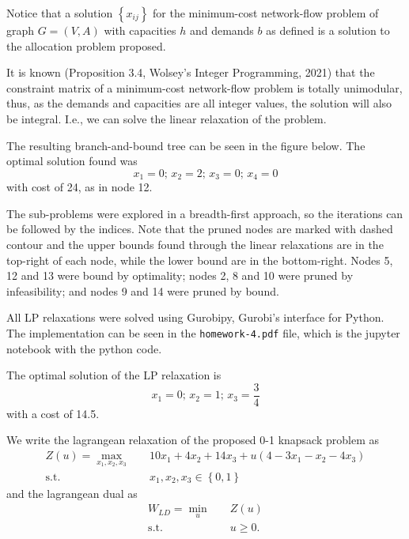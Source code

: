 \documentclass[a4paper]{report}
\begin{document}
Notice that a solution $\left\{ x_{ij} \right\}$ for the minimum-cost network-flow problem of graph $G=\left( V,A \right) $ with capacities $h$ and demands $b$ as defined is a solution to the allocation problem proposed.

It is known (Proposition 3.4, Wolsey's Integer Programming, 2021) that the constraint matrix of a minimum-cost network-flow problem is totally unimodular, thus, as the demands and capacities are all integer values, the solution will also be integral. I.e., we can solve the linear relaxation of the problem.


The resulting branch-and-bound tree can be seen in the figure below. The optimal solution found was \[
x_1 = 0;\, x_2=2;\, x_3=0;\,x_4=0
\] with cost of 24, as in node 12.


The sub-problems were explored in a breadth-first approach, so the iterations can be followed by the indices. Note that the pruned nodes are marked with dashed contour and the upper bounds found through the linear relaxations are in the top-right of each node, while the lower bound are in the bottom-right. Nodes 5, 12 and 13 were bound by optimality; nodes 2, 8 and 10 were pruned by infeasibility; and nodes 9 and 14 were pruned by bound.

All LP relaxations were solved using Gurobipy, Gurobi's interface for Python. The implementation can be seen in the \texttt{homework-4.pdf} file, which is the jupyter notebook with the python code.


The optimal solution of the LP relaxation is \[
x_1 = 0;\, x_2=1;\, x_3=\frac{3}{4}
\] with a cost of 14.5.

We write the lagrangean relaxation of the proposed 0-1 knapsack problem as
\begin{align*}
    Z(u) = \max_{x_1,x_2,x_3} \quad & 10x_1+4x_2+14x_3 + u\left( 4-3x_1-x_2-4x_3 \right)  \\
    \textrm{s.t.} \quad & x_1,x_2,x_3\in \left\{ 0,1 \right\}
\end{align*}
and the lagrangean dual as
\begin{align*}
    W_{LD} = \min_{u} \quad & Z(u) \\
    \textrm{s.t.} \quad & u\ge 0
.\end{align*}
\end{document}
